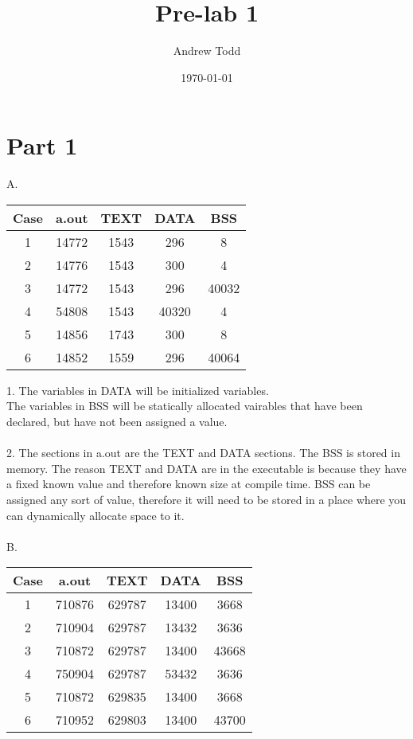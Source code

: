 \documentclass{article}
\title{Pre-lab 1}
\author{Andrew Todd}
\date{\today}
\begin{document}
\maketitle

\section*{Part 1}
A.
\begin{center}
    \begin{tabular}{|c | c | c | c | c|}
        \hline
        Case & a.out & TEXT & DATA & BSS \\ [0.5ex]
        \hline
        1 & 14772 & 1543 & 296 & 8 \\
        \hline
        2 & 14776 & 1543 & 300 & 4 \\
        \hline
        3 & 14772 & 1543 & 296 & 40032 \\
        \hline
        4 & 54808 & 1543 & 40320 & 4 \\
        \hline
        5 & 14856 & 1743 & 300 & 8 \\
        \hline
        6 & 14852 & 1559 & 296 & 40064 \\
        \hline
    \end{tabular}
\end{center}
1.
    The variables in DATA will be initialized variables. \\
    The variables in BSS will be statically allocated vairables that have been declared, but have not been assigned a value. \\
\\
2.
    The sections in a.out are the TEXT and DATA sections. The BSS is stored in memory. The reason TEXT and DATA are in the executable is because they have a fixed known value and therefore known size at compile time. BSS can be assigned any sort of value, therefore it will need to be stored in a place where you can dynamically allocate space to it. \\
\\
B.
\begin{center}
    \begin{tabular}{|c | c | c | c | c|}
        \hline
        Case & a.out & TEXT & DATA & BSS \\ [0.5ex]
        \hline
        1 & 710876 & 629787 & 13400 & 3668 \\
        \hline
        2 & 710904 & 629787 & 13432 & 3636 \\
        \hline
        3 & 710872 & 629787 & 13400 & 43668 \\
        \hline
        4 & 750904 & 629787 & 53432 & 3636 \\
        \hline
        5 & 710872 & 629835 & 13400 & 3668 \\
        \hline
        6 & 710952 & 629803 & 13400 & 43700 \\
        \hline
    \end{tabular}
\end{center}
\end{document}
